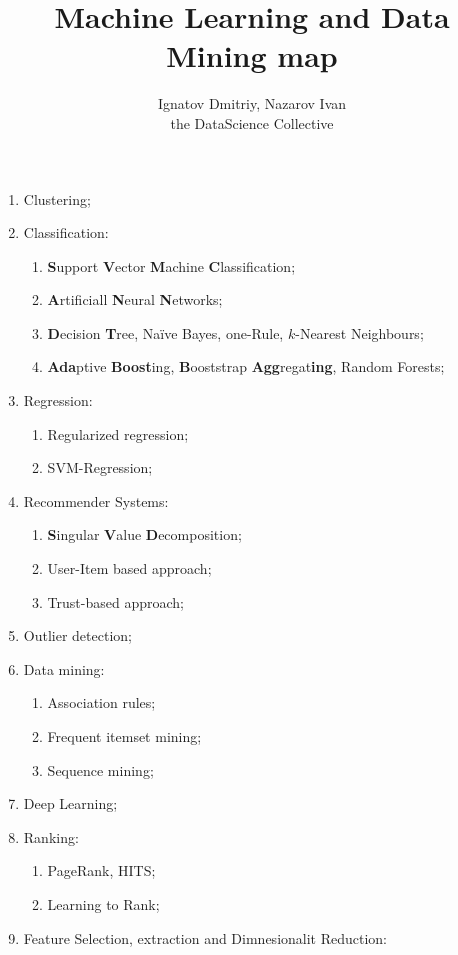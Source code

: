 \documentclass[a4paper]{article}
\title{Machine Learning and Data Mining map}
\author{Ignatov Dmitriy, Nazarov Ivan \rus{101мНОД(ИССА)}\\the DataScience Collective}
\begin{document}
\maketitle

\begin{enumerate}
	\item Clustering;
	\item Classification: \begin{enumerate}
		\item \textbf{S}upport \textbf{V}ector \textbf{M}achine \textbf{C}lassification;
		\item \textbf{A}rtificiall \textbf{N}eural \textbf{N}etworks;
		\item \textbf{D}ecision \textbf{T}ree, Na\"ive Bayes, one-Rule, $k$-Nearest Neighbours;
		\item \textbf{Ada}ptive \textbf{Boost}ing, \textbf{B}ooststrap \textbf{Agg}regat\textbf{ing}, Random Forests;
	\end{enumerate}
	\item Regression: \begin{enumerate}
		\item Regularized regression;
		\item SVM-Regression;
	\end{enumerate}
	\item Recommender Systems: \begin{enumerate}
		\item \textbf{S}ingular \textbf{V}alue \textbf{D}ecomposition;
		\item User-Item based approach;
		\item Trust-based approach;
	\end{enumerate}
	\item Outlier detection;
	\item Data mining: \begin{enumerate}
		\item Association rules;
		\item Frequent itemset mining;
		\item Sequence mining;
	\end{enumerate}
  \item Deep Learning;
  \item Ranking: \begin{enumerate}
    \item PageRank, HITS;
    \item Learning to Rank;
  \end{enumerate}
  \item Feature Selection, extraction and Dimnesionalit Reduction: \begin{enumerate}

\end{enumerate}
\end{enumerate}
\end{document}
